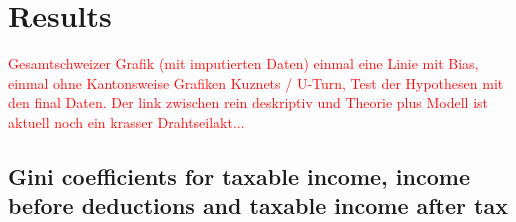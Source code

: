 
\section{Results}

\textcolor{red}{Gesamtschweizer Grafik (mit imputierten Daten) einmal eine Linie mit Bias, einmal ohne
Kantonsweise Grafiken
Kuznets / U-Turn, Test der Hypothesen mit den final Daten. Der link zwischen rein deskriptiv  und Theorie plus Modell ist aktuell noch ein krasser Drahtseilakt...}

\subsection{Gini coefficients for taxable income, income before deductions and taxable income after tax}

\begin{knitrout}
\color{fgcolor}\begin{kframe}
\begin{alltt}
 \hlkwb{<-} \hlstd{(}\hlstd{)}
\hlopt{$} \hlkwb{<-} \hlopt{$}\hlopt{/}\hlopt{$}  
\end{alltt}
\end{kframe}
\end{knitrout}


